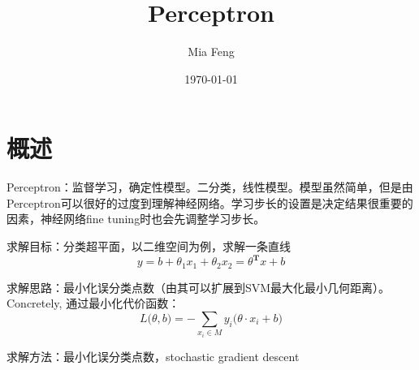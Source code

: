 \documentclass{ctexart}
\title{Perceptron} %
\author{Mia Feng} %
\date{\today} %
\begin{document}
\maketitle %




\section{概述}
Perceptron：监督学习，确定性模型。二分类，线性模型。模型虽然简单，但是由Perceptron可以很好的过度到理解神经网络\cite{stanf:cs229}。学习步长的设置是决定结果很重要的因素，神经网络fine tuning时也会先调整学习步长。

求解目标：分类超平面，以二维空间为例，求解一条直线
\begin{equation}
y = b+\theta_1x_1+\theta_2x_2=\theta^{\mathbf{T}}x+b
\end{equation}

求解思路：最小化误分类点数（由其可以扩展到SVM最大化最小几何距离）。Concretely, 通过最小化代价函数\cite{LiHang:Statistic}：
\begin{equation}
L\big(\theta,b \big)=-\sum\limits_{x_i\in M}y_i\big(\theta\cdot x_i+b\big)
\end{equation}

求解方法：最小化误分类点数，stochastic gradient descent
\end{document}
